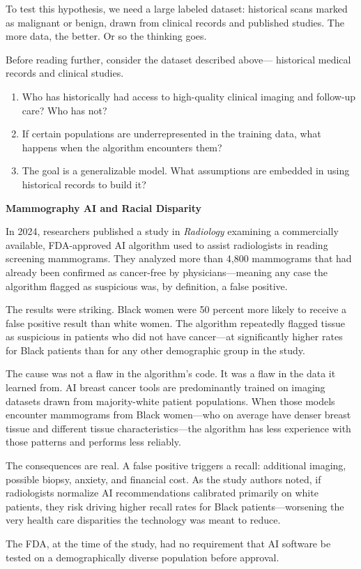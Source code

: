 To test this hypothesis, we need a large labeled dataset: historical 
scans marked as malignant or benign, drawn from clinical records and 
published studies. The more data, the better. Or so the thinking goes.

\begin{checkpoint}
Before reading further, consider the dataset described above---
historical medical records and clinical studies.
\begin{enumerate}
    \item Who has historically had access to high-quality clinical 
    imaging and follow-up care? Who has not?
    \item If certain populations are underrepresented in the training 
    data, what happens when the algorithm encounters them?
    \item The goal is a generalizable model. What assumptions are 
    embedded in using historical records to build it?
\end{enumerate}
\end{checkpoint}

\begin{realworld}
\textbf{Mammography AI and Racial Disparity}

In 2024, researchers published a study in \textit{Radiology} examining 
a commercially available, FDA-approved AI algorithm used to assist 
radiologists in reading screening mammograms. They analyzed more than 
4,800 mammograms that had already been confirmed as cancer-free by 
physicians---meaning any case the algorithm flagged as suspicious was, 
by definition, a false positive.

The results were striking. Black women were 50 percent more likely to 
receive a false positive result than white women. The algorithm 
repeatedly flagged tissue as suspicious in patients who did not have 
cancer---at significantly higher rates for Black patients than for any 
other demographic group in the study.

The cause was not a flaw in the algorithm's code. It was a flaw in the 
data it learned from. AI breast cancer tools are predominantly trained 
on imaging datasets drawn from majority-white patient populations. When 
those models encounter mammograms from Black women---who on average have 
denser breast tissue and different tissue characteristics---the algorithm 
has less experience with those patterns and performs less reliably.

The consequences are real. A false positive triggers a recall: 
additional imaging, possible biopsy, anxiety, and financial cost. As 
the study authors noted, if radiologists normalize AI recommendations 
calibrated primarily on white patients, they risk driving higher recall 
rates for Black patients---worsening the very health care disparities 
the technology was meant to reduce.

The FDA, at the time of the study, had no requirement that AI 
software be tested on a demographically diverse population before 
approval.
\end{realworld}

